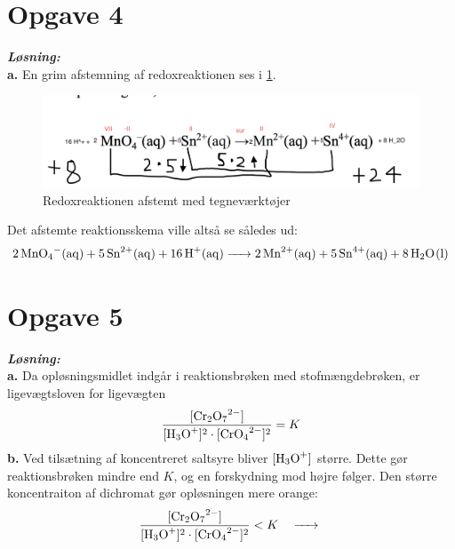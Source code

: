 \documentclass{report}
\newcommand{\sol}{\setlength{\parindent}{0cm}\textbf{\textit{Løsning:}}\setlength{\parindent}{1cm}}
\begin{document}
\section*{Opgave 4}
\sol \\
\textbf{a.}
En grim afstemning af redoxreaktionen ses i \cref{fig:redox}.
\begin{figure}[H]
\begin{center}
  \includegraphics[width=\textwidth]{redox.png}
\end{center}
\caption{Redoxreaktionen afstemt med tegneværktøjer}
\label{fig:redox}
\end{figure}
Det afstemte reaktionsskema ville altså se således ud: 
\[
\ce{2MnO4-(aq) + 5 Sn^2+(aq) + 16 H+(aq) -> 2 Mn^2+(aq) + 5 Sn^4+(aq) + 8 H2O(l)} 
\] 

\section*{Opgave 5}
\sol \\
\textbf{a.}
Da opløsningsmidlet indgår i reaktionsbrøken med stofmængdebrøken, er ligevægtsloven for ligevægten 
\[
\frac{[\ce{Cr_2O7^2-} ]}{[\ce{H3O+} ]^2 \cdot [\ce{CrO4^2-} ]^2}=K
\] 
\textbf{b.}
Ved tilsætning af koncentreret saltsyre bliver $[\ce{H3O+} ]$ større. 
Dette gør reaktionsbrøken mindre end $K$, og en forskydning mod højre følger.
Den større koncentraiton af dichromat gør opløsningen mere orange: 
\[
\frac{[\ce{Cr_2O7^2-} ]}{[\ce{H3O+} ]^2 \cdot [\ce{CrO4^2-} ]^2}<K \quad \ce{->} 
\] 
\end{document}
